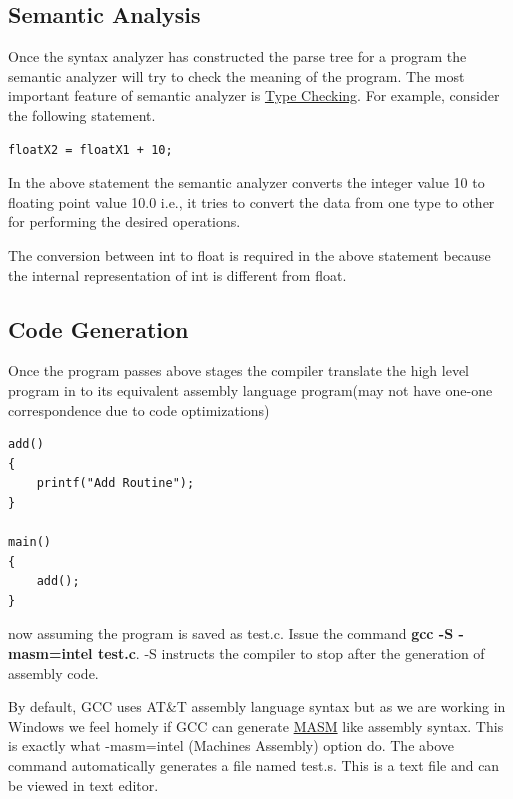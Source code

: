 \documentclass{article}
\begin{document}
\subsection{Semantic Analysis}
Once the syntax analyzer has constructed the parse tree for a program the semantic analyzer will try to check the meaning of the program. The most important feature of semantic analyzer is \href{''https://en.wikipedia.org/wiki/Type_system''}{Type Checking}. For example, consider the following statement.
\begin{verbatim}
floatX2 = floatX1 + 10;
\end{verbatim}
In the above statement the semantic analyzer converts the integer value 10 to floating point value 10.0 i.e., it tries to convert the data from one type to other for performing the desired operations.

The conversion between int to float is required in the above statement because the internal representation of int is different from float.
\subsection{Code Generation}
Once the program passes above stages the compiler translate the high level program in to its equivalent assembly language program(may not have one-one correspondence due to code optimizations)
\begin{verbatim}
add()
{
    printf("Add Routine");
}

main()
{
    add();
}
\end{verbatim}
now assuming the program is saved as test.c. Issue the command {\textbf{gcc -S -masm=intel test.c}}. -S instructs the compiler to stop after the generation of assembly code.

By default, GCC uses AT\&T assembly language syntax but as we are working in Windows we feel homely if GCC can generate \href{''https://en.wikipedia.org/wiki/Microsoft_Macro_Assembler''}{MASM} like assembly syntax. This is exactly what -masm=intel (Machines Assembly) option do. The above command automatically generates a file named test.s. This is a text file and can be viewed in text editor.
\end{document}
